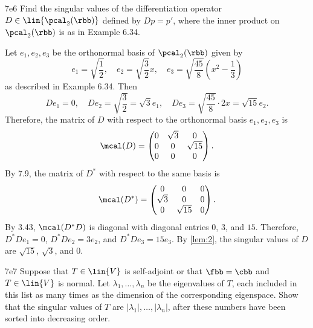 \begin{exercise}{7e6}
    Find the singular values of the differentiation operator $D \in \lin{\pcal_2(\rbb)}$ defined by $Dp = p'$, where the inner product on $\pcal_2(\rbb)$ is as in Example 6.34.
\end{exercise}

\begin{sol}
    Let $e_1, e_2, e_3$ be the orthonormal basis of $\pcal_2(\rbb)$ given by
    \[
        e_1 = \sqrt{\frac{1}{2}}, \quad e_2 = \sqrt{\frac{3}{2}} x, \quad e_3 = \sqrt{\frac{45}{8}}\left(x^2 - \frac{1}{3}\right)
    \]
    as described in Example 6.34.
    Then
    \[
        D e_1 = 0, \quad D e_2 = \sqrt{\frac{3}{2}} = \sqrt{3} e_1, \quad D e_3 = \sqrt{\frac{45}{8}} \cdot 2 x = \sqrt{15} e_2.
    \]
    Therefore, the matrix of $D$ with respect to the orthonormal basis $e_1, e_2, e_3$ is
    \[
        \mcal(D) =
        \begin{pmatrix}
            0 & \sqrt{3} & 0 \\
            0 & 0 & \sqrt{15} \\
            0 & 0 & 0
        \end{pmatrix}.
    \]
    By 7.9, the matrix of $D^\ast$ with respect to the same basis is
    \[
        \mcal(D^\ast) =
        \begin{pmatrix}
            0 & 0 & 0 \\
            \sqrt{3} & 0 & 0 \\
            0 & \sqrt{15} & 0
        \end{pmatrix}.
    \]
    By 3.43, $\mcal(D^\ast D)$ is diagonal with diagonal entries $0$, $3$, and $15$.
    Therefore, $D^\ast D e_1 = 0$, $D^\ast D e_2 = 3 e_2$, and $D^\ast D e_3 = 15 e_3$.
    By \autoref{lem:2}, the singular values of $D$ are $\sqrt{15}$, $\sqrt{3}$, and $0$.
\end{sol}

\begin{exercise}{7e7}
    Suppose that $T \in \lin{V}$ is self-adjoint or that $\fbb = \cbb$ and $T \in \lin{V}$ is normal.
    Let $\lambda_1, \ldots, \lambda_n$ be the eigenvalues of $T$, each included in this list as many times as the dimension of the corresponding eigenspace.
    Show that the singular values of $T$ are $|\lambda_1|, \ldots, |\lambda_n|$, after these numbers have been sorted into decreasing order.
\end{exercise}

